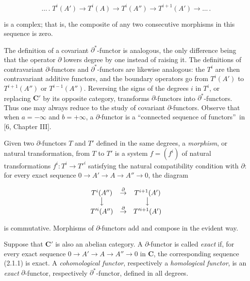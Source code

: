 
\noindent
\[
\tag{2.1.1.}
\ldots\,.\;T^i(A')\to T^i(A)
\to T^i(A'')\to T^{i+1}(A')
\to\ldots\,.
\]

\noindent is a complex; that is, the composite of any two consecutive
morphisms in this sequence is zero.

The definition of a covariant $\partial^*$-functor is analogous, the only
difference being that the operator $\partial$ lowers degree by one instead of
raising it. The definitions of contravariant $\partial$-functors and
$\partial^*$-functors are likewise analogous: the $T^i$ are then
contravariant additive functors, and the boundary operators go from
$T^i(A')$ to $T^{i+1}(A'')$ or $T^{i-1}(A'')$. Reversing the signs of the
degrees $i$ in $T^i$, or replacing $\mathbf{C}'$ by its opposite category, transforms
$\partial$-functors into $\partial^*$-functors. Thus one may always reduce to
the study of covariant $\partial$-functors. Observe that when $a=-\infty$ and
$b=+\infty$, a $\partial$-functor is a \textquotedblleft connected sequence
of functors\textquotedblright\ in [6, Chapter III].

Given two $\partial$-functors $T$ and $T'$ defined in the same degrees, a
\textit{morphism}, or natural transformation, from $T$ to $T'$ is a system
$f=(f^i)$ of natural transformations $f^i:T^i\to T'^i$ satisfying
the natural compatibility condition with $\partial$: for every exact
sequence
$0\to A'\to A\to A''\to 0$,
the diagram

\[
\begin{array}{ccc}
T^i(A'') & \mathop{\to}\limits^{\partial} & T^{i+1}(A')\\
\big\downarrow && \big\downarrow\\
T'^i(A'') & \mathop{\to}\limits^{\partial} & T'^{i+1}(A')
\end{array}
\]

\noindent is commutative. Morphisms of $\partial$-functors add and compose in
the evident way.

Suppose that $\mathbf{C}'$ is also an abelian category. A $\partial$-functor is called
\textit{exact} if, for every exact sequence
$0\to A'\to A\to A''\to 0$
in $\mathbf{C}$, the corresponding sequence (2.1.1) is exact. A
\textit{cohomological functor}, respectively a \textit{homological functor},
is an \textit{exact} $\partial$-functor, respectively $\partial^*$-functor, defined in
all degrees.


